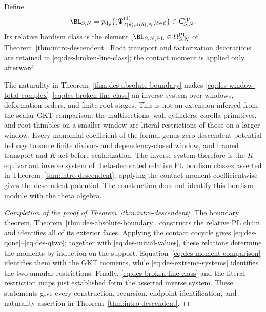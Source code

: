 Define
\begin{equation}
 \BL_{S,N}
 =p_{\mathrm{dp}}
   \bigl((\Psi^{(1)}_{I(\delta),\mathbf d(\delta),N})_{
          \delta\in\mathcal E}\bigr)
 \in\mathsf C^{\mathrm{dp}}_{S,N}.
 \label{eq:des-broken-line-class}
\end{equation}
Its relative bordism class is the element
$[\BL_{S,N}]_{\mathrm{PL}}\in\Omega^{\mathrm{PL}}_{S,N}$ of
Theorem~\ref{thm:intro-descendent}.
Root transport and factorization decorations are retained in
\eqref{eq:des-broken-line-class}; the contact moment is applied only
afterward.

The naturality in Theorem~\ref{thm:des-absolute-boundary} makes
\eqref{eq:des-window-total-complex}--\eqref{eq:des-broken-line-class} an
inverse system over windows, deformation orders, and finite root stages.
This is not an extension inferred from the scalar GKT comparison: the
multisections, wall cylinders, corolla primitives, and root thimbles on a
smaller window are literal restrictions of those on a larger window.
Every monomial coefficient of the formal genus-zero descendent potential
belongs to some finite divisor- and dependency-closed window, and framed
transport and $K$ act before scalarization.  The inverse system therefore
is the $K$-equivariant inverse system of theta-decorated relative PL bordism
classes asserted in Theorem~\ref{thm:intro-descendent}; applying the contact
moment coefficientwise gives the descendent potential.  The construction
does not identify this bordism module with the theta algebra.

\begin{proof}[Completion of the proof of Theorem~\ref{thm:intro-descendent}]
The boundary theorem, Theorem~\ref{thm:des-absolute-boundary}, constructs the
relative PL chain and identifies all of its exterior faces.  Applying the
contact cocycle gives \eqref{eq:des-qone}--\eqref{eq:des-qtwo}; together with
\eqref{eq:des-initial-values}, these relations determine the moments by
induction on the support.  Equation~\eqref{eq:des-moment-comparison} identifies
them with the GKT moments, while \eqref{eq:des-extreme-systems} identifies the
two annular restrictions.  Finally, \eqref{eq:des-broken-line-class} and the
literal restriction maps just established form the asserted inverse system.
These statements give every construction, recursion, endpoint identification,
and naturality assertion in Theorem~\ref{thm:intro-descendent}.
\end{proof}
